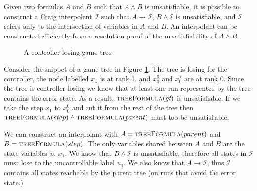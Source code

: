\documentclass{llncs}
\begin{document}
Given two formulas $A$ and $B$ such that $A \land B$ is unsatisfiable, it is
possible to construct a Craig interpolant\cite{craig1957} $\mathcal{I}$ such
that $A \to \mathcal{I}$, $B \land \mathcal{I}$ is unsatisfiable, and
$\mathcal{I}$ refers only to the intersection of variables in $A$ and $B$.  An
interpolant can be constructed efficiently from a resolution proof of the
unsatisfiability of $A \land B$ \cite{pudlak1997}.

\begin{figure}
    \centering
    \caption{A controller-losing game tree}
    \label{fig:interpolatetree}
\end{figure}

Consider the snippet of a game tree in Figure \ref{fig:interpolatetree}. The
tree is losing for the controller, the node labelled $x_1$ is at rank 1, and
$x_0^0$ and $x_0^1$ are at rank 0. Since the tree is controller-losing we know
that at least one run represented by the tree contains the error state.  As
a result, $\textsc{treeFormula}(gt)$ is unsatisfiable. If we take the step
$x_1$ to $x_0^0$ and cut it from the rest of the tree then
$\textsc{treeFormula}(step) \land \textsc{treeFormula}(parent)$ must too be
unsatisfiable.

We can construct an interpolant with $A = \textsc{treeFormula}(parent)$ and $B
= \textsc{treeFormula}(step)$. The only variables shared between $A$ and $B$
are the state variables at $x_1$. We know that $B \land \mathcal{I}$ is
unsatisfiable, therefore all states in $\mathcal{I}$ must lose to the
uncontrollable label $u_1$. We also know that $A \to \mathcal{I}$, thus
$\mathcal{I}$ contains all states reachable by the parent tree (on runs that
avoid the error state.)
\end{document}
